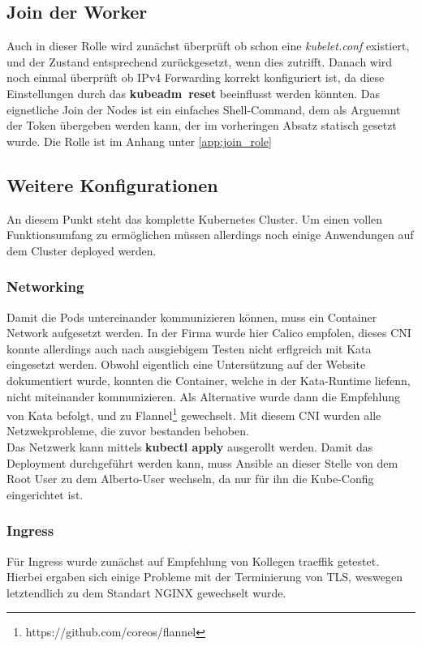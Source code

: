 \subsection{Join der Worker}
Auch in dieser Rolle wird zunächst überprüft ob schon eine \textit{kubelet.conf} existiert, und der Zustand entsprechend zurückgesetzt, wenn dies zutrifft.
Danach wird noch einmal überprüft ob IPv4 Forwarding korrekt konfiguriert ist, da diese Einstellungen durch das \textbf{kubeadm\ reset} beeinflusst werden könnten.
Das eignetliche Join der Nodes ist ein einfaches Shell-Command, dem als Arguemnt der Token übergeben werden kann, der im vorheringen Absatz statisch gesetzt wurde.
Die Rolle ist im Anhang unter \ref{app:join_role}


\subsection{Weitere Konfigurationen}
An diesem Punkt steht das komplette Kubernetes Cluster.
Um einen vollen Funktionsumfang zu ermöglichen müssen allerdings noch einige Anwendungen auf dem Cluster deployed werden.

\subsubsection{Networking}
Damit die Pods untereinander kommunizieren können, muss ein Container Network aufgesetzt werden.
In der Firma wurde hier Calico empfolen, dieses \ac{CNI} konnte allerdings auch nach ausgiebigem Testen nicht erflgreich mit Kata eingesetzt werden.
Obwohl eigentlich eine Untersützung auf der Website dokumentiert wurde, konnten die Container, welche in der Kata-Runtime liefenn, nicht miteinander kommunizieren.
Als Alternative wurde dann die Empfehlung von Kata befolgt, und zu Flannel\footnote{https://github.com/coreos/flannel} gewechselt. 
Mit diesem \ac{CNI} wurden alle Netzwekprobleme, die zuvor bestanden behoben.
\\
Das Netzwerk kann mittels \textbf{kubectl apply} ausgerollt werden.
Damit das Deployment durchgeführt werden kann, muss Ansible an dieser Stelle von dem Root User zu dem Alberto-User wechseln, da nur für ihn die Kube-Config eingerichtet ist. 

\subsubsection{Ingress}
Für Ingress wurde zunächst auf Empfehlung von Kollegen traeffik getestet. 
Hierbei ergaben sich einige Probleme mit der Terminierung von \ac{TLS}, weswegen letztendlich zu dem Standart NGINX gewechselt wurde.

